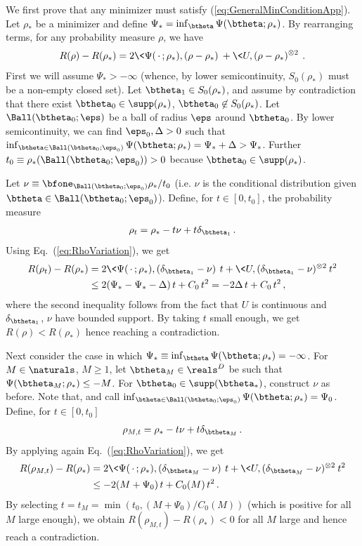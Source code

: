 \documentclass[11pt]{article}
\begin{document}
We first prove that any minimizer must satisfy  (\ref{eq:GeneralMinConditionApp}).
Let $\rho_*$ be a minimizer and define $\Psi_*=\inf_{\btheta}\Psi(\btheta;\rho_*)$.
By rearranging terms, for  any probability measure $\rho$, we have
%
\begin{align}
%
R(\rho)- R(\rho_*) = 2\<\Psi(\,\cdot\, ;\rho_*),(\rho-\rho_*)\> + \<U,(\rho-\rho_*)^{\otimes 2}\>\, . \label{eq:RhoVariation}
%
\end{align}
%
First we will assume $\Psi_*>-\infty$ (whence, by lower semicontinuity, $S_0(\rho_*)$ must be a non-empty closed set).
Let $\btheta_1\in S_0(\rho_*)$, and assume by contradiction that there exist $\btheta_0\in\supp(\rho_*)$, $\btheta_0\not\in S_0(\rho_*)$.
Let $\Ball(\btheta_0;\eps)$ be a ball of radius $\eps$ around $\btheta_0$. By lower semicontinuity, we can find $\eps_0, \Delta> 0 $
such that $\inf_{\btheta\in\Ball(\btheta_0;\eps_0)}\Psi(\btheta;\rho_*) =\Psi_*+\Delta>\Psi_*$. Further $t_0 \equiv \rho_*(\Ball(\btheta_0;\eps_0)) >0$
because $\btheta_0\in\supp(\rho_*)$. 

Let $\nu \equiv \bfone_{\Ball(\btheta_0;\eps_0)} \rho_*/t_0$ (i.e. $\nu$ is the conditional distribution given $\btheta\in\Ball(\btheta_0;\eps_0)$).
Define, for $t\in [0,t_0]$, the probability measure
%
\begin{align}
%
\rho_t = \rho_*-t\nu+t\delta_{\btheta_1}\, .
%
\end{align}
%
Using Eq.~(\ref{eq:RhoVariation}), we get
%
\begin{align}
%
R(\rho_t)- R(\rho_*) &= 2\<\Psi(\,\cdot\, ;\rho_*),(\delta_{\btheta_1}-\nu)\>\,  t+ \<U,(\delta_{\btheta_1}-\nu)^{\otimes 2}\>t^2\\
& \le 2(\Psi_*-\Psi_*-\Delta)\, t +C_0\, t^2 = -2\Delta\, t+C_0\, t^2\, ,
%
\end{align}
%
where the second inequality follows from the fact that  $U$ is continuous and $\delta_{\btheta_1}$, $\nu$ have bounded support.
By taking $t$ small enough, we get $R(\rho)<R(\rho_*)$ hence reaching a contradiction.

Next consider the case in which $\Psi_*\equiv \inf_{\btheta}\Psi(\btheta;\rho_*)=-\infty$. For $M\in\naturals$, $M\ge 1$, let $\btheta_M\in\reals^D$ be such that $\Psi(\btheta_M;\rho_*)\le -M$. For $\btheta_0\in\supp(\btheta_*)$, construct $\nu$
as before. Note that, and call $\inf_{\btheta\in\Ball(\btheta_0;\eps_0)} \Psi(\btheta;\rho_*)=\Psi_0$. Define, for $t\in[0, t_0]$
%
\begin{align}
%
\rho_{M,t} = \rho_*-t\nu+t\delta_{\btheta_M}\, .
%
\end{align}
%
By applying again Eq.~(\ref{eq:RhoVariation}), we get
%
\begin{align}
%
R(\rho_{M,t})- R(\rho_*) &= 2\<\Psi(\,\cdot\, ;\rho_*),(\delta_{\btheta_M}-\nu)\>\,  t+ \<U,(\delta_{\btheta_M}-\nu)^{\otimes 2}\>t^2\\
& \le -2(M+\Psi_0)\, t +C_0(M)\, t^2 \, .
%
\end{align}
%
By selecting $t=t_M = \min(t_0,(M+\Psi_0)/C_0(M))$ (which is positive for all $M$ large enough), we obtain $R(\rho_{M,t})- R(\rho_*)<0$
for all $M$ large and hence reach a contradiction.
\end{document}
